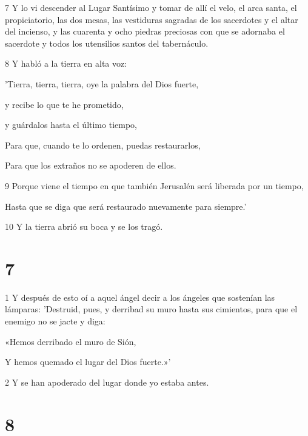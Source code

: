 \par 7 Y lo vi descender al Lugar Santísimo y tomar de allí el velo, el arca santa, el propiciatorio, las dos mesas, las vestiduras sagradas de los sacerdotes y el altar del incienso, y las cuarenta y ocho piedras preciosas con que se adornaba el sacerdote y todos los utensilios santos del tabernáculo.

\par 8 Y habló a la tierra en alta voz:

\par 'Tierra, tierra, tierra, oye la palabra del Dios fuerte,

\par y recibe lo que te he prometido,

\par y guárdalos hasta el último tiempo,

\par Para que, cuando te lo ordenen, puedas restaurarlos,

\par Para que los extraños no se apoderen de ellos.

\par 9 Porque viene el tiempo en que también Jerusalén será liberada por un tiempo,

\par Hasta que se diga que será restaurado nuevamente para siempre.'

\par 10 Y la tierra abrió su boca y se los tragó.

\chapter{7}

\par 1 Y después de esto oí a aquel ángel decir a los ángeles que sostenían las lámparas: 'Destruid, pues, y derribad su muro hasta sus cimientos, para que el enemigo no se jacte y diga:

\par «Hemos derribado el muro de Sión,

\par Y hemos quemado el lugar del Dios fuerte.»'

\par 2 Y se han apoderado del lugar donde yo estaba antes.

\chapter{8}


